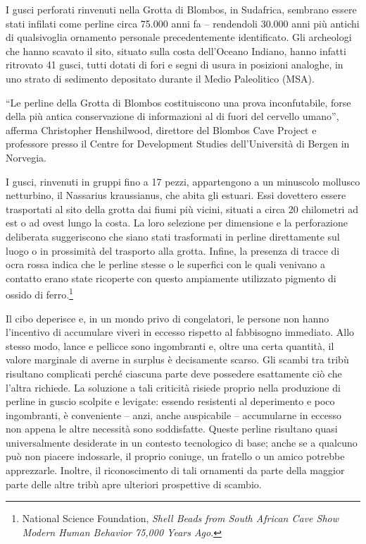 \documentclass[
  a5paper,
  smalldemyvopaper,10pt,twoside,onecolumn,openright,extrafontsizes,hidelinks]{memoir}
\renewenvironment{quote}%
               {\list{}{\rightmargin=.6cm\leftmargin=.6cm}%
                \itshape \item[]}%
               {\endlist}
\begin{document}
\begin{quote}
I gusci perforati rinvenuti nella Grotta di Blombos, in Sudafrica,
sembrano essere stati infilati come perline circa 75.000 anni fa --
rendendoli 30.000 anni più antichi di qualsivoglia ornamento personale
precedentemente identificato. Gli archeologi che hanno scavato il sito,
situato sulla costa dell'Oceano Indiano, hanno infatti ritrovato 41
gusci, tutti dotati di fori e segni di usura in posizioni analoghe, in
uno strato di sedimento depositato durante il Medio Paleolitico (MSA).
\end{quote}

\begin{quote}
``Le perline della Grotta di Blombos costituiscono una prova
inconfutabile, forse della più antica conservazione di informazioni al
di fuori del cervello umano'', afferma Christopher Henshilwood,
direttore del Blombos Cave Project e professore presso il Centre for
Development Studies dell'Università di Bergen in Norvegia.
\end{quote}

\begin{quote}
I gusci, rinvenuti in gruppi fino a 17 pezzi, appartengono a un
minuscolo mollusco netturbino, il Nassarius kraussianus, che abita gli
estuari. Essi dovettero essere trasportati al sito della grotta dai
fiumi più vicini, situati a circa 20 chilometri ad est o ad ovest lungo
la costa. La loro selezione per dimensione e la perforazione deliberata
suggeriscono che siano stati trasformati in perline direttamente sul
luogo o in prossimità del trasporto alla grotta. Infine, la presenza di
tracce di ocra rossa indica che le perline stesse o le superfici con le
quali venivano a contatto erano state ricoperte con questo ampiamente
utilizzato pigmento di ossido di ferro.\footnote{National Science
  Foundation, \emph{Shell Beads from South African Cave Show Modern
  Human Behavior 75,000 Years Ago}.}
\end{quote}

Il cibo deperisce e, in un mondo privo di congelatori, le persone non
hanno l'incentivo di accumulare viveri in eccesso rispetto al fabbisogno
immediato. Allo stesso modo, lance e pellicce sono ingombranti e, oltre
una certa quantità, il valore marginale di averne in surplus è
decisamente scarso. Gli scambi tra tribù risultano complicati perché
ciascuna parte deve possedere esattamente ciò che l'altra richiede. La
soluzione a tali criticità risiede proprio nella produzione di perline
in guscio scolpite e levigate: essendo resistenti al deperimento e poco
ingombranti, è conveniente -- anzi, anche auspicabile -- accumularne in
eccesso non appena le altre necessità sono soddisfatte. Queste perline
risultano quasi universalmente desiderate in un contesto tecnologico di
base; anche se a qualcuno può non piacere indossarle, il proprio
coniuge, un fratello o un amico potrebbe apprezzarle. Inoltre, il
riconoscimento di tali ornamenti da parte della maggior parte delle
altre tribù apre ulteriori prospettive di scambio.
\end{document}
